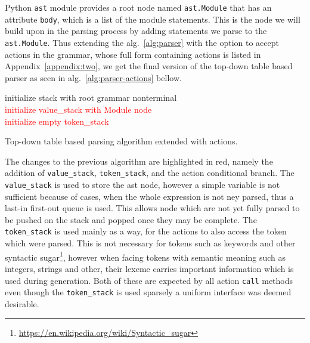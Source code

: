 Python \texttt{ast} module provides a root node named \texttt{ast.Module} that has an attribute \texttt{body}, which is a list of the module statements. This is the node we will build upon in the parsing process by adding statements we parse to the \texttt{ast.Module}. 
Thus extending the alg.~\ref{alg:parser} with the option to accept actions in the grammar, whose full form containing actions is listed in Appendix~\ref{appendix:two}, we get the final version of the top-down table based parser as seen in alg.~\ref{alg:parser-actions} bellow.



\begingroup
\vspace{1.5em}
\begin{algorithm}[H]\label{alg:parser-actions}
  \setlength{\algomargin}{1.5em}
  initialize stack with root grammar nonterminal\\
  \textcolor{red}{initialize value\_stack with Module node}\\
  \textcolor{red}{initialize empty token\_stack }


\caption{Top-down table based parsing algorithm extended with actions.}
\end{algorithm}
\vspace{1.5em}

The changes to the previous algorithm are highlighted in red, namely the addition of \texttt{value\_stack}, \texttt{token\_stack}, and the action conditional branch. The \texttt{value\_stack} is used to store the \gls{ast} node, however a simple variable is not sufficient because of cases, when the whole expression is not ney parsed, thus a last-in first-out queue is used. This allows node which are not yet fully parsed to be pushed on the stack and popped once they may be complete. The \texttt{token\_stack} is used mainly as a way, for the actions to also access the token which were parsed. This is not necessary for tokens such as keywords and other syntactic sugar\footnote{\url{https://en.wikipedia.org/wiki/Syntactic_sugar}}, however when facing tokens with semantic meaning such as integers, strings and other, their lexeme carries important information which is used during generation. Both of these are expected by all action \texttt{call} methods even though the \texttt{token\_stack} is used sparsely a uniform interface was deemed desirable.

